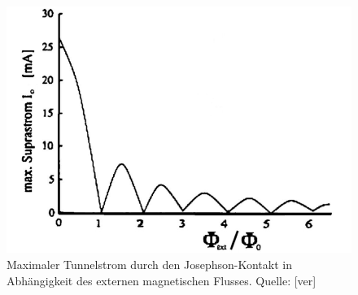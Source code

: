 \begin{figure}[h]
\begin{center}
\includegraphics[scale=0.6]{Bilder/tstrom}
\caption{Maximaler Tunnelstrom durch den Josephson-Kontakt in Abhängigkeit des externen magnetischen Flusses. Quelle: [ver]}
\end{center}
\end{figure}